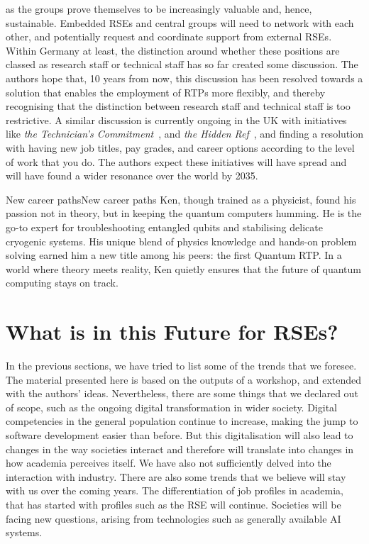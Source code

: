 \documentclass{eceasst}
\begin{document}
as the groups prove themselves to be increasingly valuable and, hence, sustainable.
Embedded RSEs and central groups will need to network with each other,
and potentially request and coordinate support from external RSEs.
Within Germany at least, the distinction around whether these positions are classed as research staff or technical staff has so far created some discussion.
The authors hope that, 10 years from now, this discussion has been resolved towards a solution that enables the employment of RTPs more flexibly,
and thereby recognising that the distinction between research staff and technical staff is too restrictive.
A similar discussion is currently ongoing in the UK with initiatives like \emph{the Technician's Commitment}~\cite{techniciancommitment}, and \emph{the Hidden Ref}~\cite{hiddenref},
and finding a resolution with having new job titles, pay grades, and career options according to the level of work that you do.
The authors expect these initiatives will have spread and will have found a wider resonance over the world by 2035.

\begin{story}{New career paths}{New career paths}
Ken, though trained as a physicist, found his passion not in theory,
but in keeping the quantum computers humming. He is the go-to expert
for troubleshooting entangled qubits and stabilising delicate cryogenic systems.
His unique blend of physics knowledge and hands-on problem solving earned him
a new title among his peers: the first Quantum RTP.
In a world where theory meets reality, Ken quietly ensures that the future
of quantum computing stays on track.
\end{story}

\section{What is in this Future for RSEs?}
In the previous sections, we have tried to list some of the trends that we foresee.
The material presented here is based on the outputs of a workshop, and extended with the authors' ideas.
Nevertheless, there are some things that we declared out of scope, such as the ongoing digital transformation in wider society.
Digital competencies in the general population continue to increase,
making the jump to software development easier than before.
But this digitalisation will also lead to changes in the way societies
interact and therefore will translate into changes in how academia perceives itself.
We have also not sufficiently delved into the interaction with industry.
There are also some trends that we believe will stay with us over the coming years.
The differentiation of job profiles in academia, that has started with profiles such as the RSE will continue.
Societies will be facing new questions, arising from technologies such as generally available AI systems.
\end{document}
